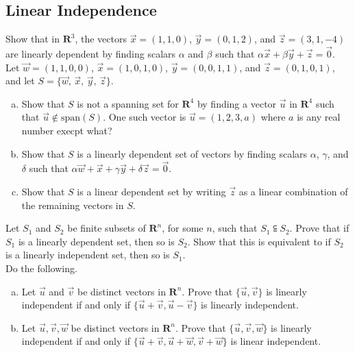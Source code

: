 \documentclass[a4paper,11pt]{article}
\newcommand{\R}{\mathbf{R}}
\begin{document}
\subsection*{Linear Independence}

 Show that in $\R^3$, the vectors $\vec
x=(1,1,0)$, $\vec y=(0,1,2)$, and $\vec z=(3,1,-4)$ are linearly dependent by
finding scalars $\alpha$ and $\beta$ such that $\alpha\vec x+\beta\vec y+\vec
z=\vec 0$. \\

 Let $\vec w=(1,1,0,0)$, $\vec x=(1,0,1,0)$, $\vec
y=(0,0,1,1)$, and $\vec z=(0,1,0,1)$, and let $S=\{\vec w,\,\vec x,\,\vec
y,\,\vec z\}$.
\begin{enumerate}[(a)]
\item Show that $S$ is not a spanning set for $\R^4$ by finding a vector $\vec
  u$ in $\R^4$ such that $\vec u \notin\text{span}(S)$. One such vector is $\vec
  u=(1,2,3,a)$ where $a$ is any real number execpt what?
\item Show that $S$ is a linearly dependent set of vectors by finding scalars
  $\alpha$, $\gamma$, and $\delta$ such that $\alpha\vec w+\vec x+\gamma\vec
  y+\delta\vec z=\vec 0$.
\item Show that $S$ is a linear dependent set by writing $\vec z$ as a linear
  combination of the remaining vectors in $S$.
\end{enumerate}

 Let $S_1$ and $S_2$ be finite subsets of $\R^n$,
for some $n$, such that $S_1 \subseteqq S_2$. Prove that if $S_1$ is a linearly
dependent set, then so is $S_2$. Show that this is equivalent to if $S_2$ is a
linearly independent set, then so is $S_1$. \\

 Do the following.
\begin{enumerate}[(a)]
\item Let $\vec u$ and $\vec v$ be distinct vectors in $\R^n$. Prove that
  $\{\vec u, \vec v\}$ is linearly independent if and only if $\{\vec u + \vec v,
  \vec u - \vec v\}$ is linearly independent.
\item Let $\vec u, \vec v, \vec w$ be distinct vectors in $\R^n$. Prove that
  $\{\vec u, \vec v, \vec w\}$ is linearly independent if and only if $\{\vec
  u+\vec v,\vec u+\vec w,\vec v+\vec w\}$ is linear independent. \\
\end{enumerate}
\end{document}
